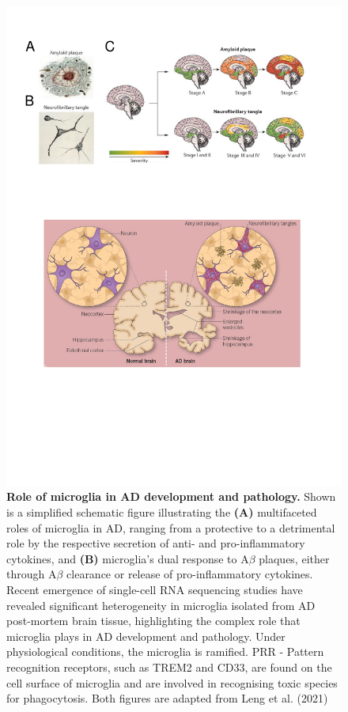 \begin{figure}[!htp]
	\centering
	\includegraphics[page=8,trim={0 9cm 0cm 0cm},clip, scale = 0.8]{Figures/Introduction_Figures.pdf}
	\captionsetup{width=0.95\textwidth,singlelinecheck=off}
	\caption[Role of microglia in AD development and pathology]%
	{\textbf{Role of microglia in AD development and pathology.} Shown is a simplified schematic figure illustrating the \textbf{(A)} multifaceted roles of microglia in AD, ranging from a protective to a detrimental role by the respective secretion of anti- and pro-inflammatory cytokines, and \textbf{(B)} microglia's dual response to A$\beta$ plaques, either through A$\beta$ clearance or release of pro-inflammatory cytokines. Recent emergence of single-cell RNA sequencing studies have revealed significant heterogeneity in microglia isolated from AD post-mortem brain tissue, highlighting the complex role that microglia plays in AD development and pathology. Under physiological conditions, the microglia is ramified. PRR - Pattern recognition receptors, such as TREM2 and CD33, are found on the cell surface of microglia and are involved in recognising toxic species for phagocytosis. Both figures are adapted from Leng et al. (2021)\cite{Leng2021a}  
	}
	\label{fig:microglia_AD}
\end{figure}


